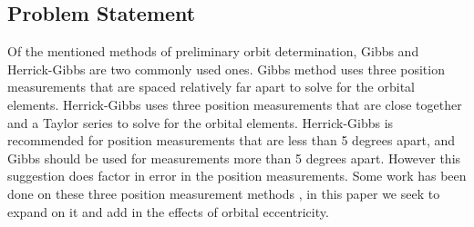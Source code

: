 \documentclass[12pt]{article}
\begin{document}
		\subsection{Problem Statement}
		Of the mentioned methods of preliminary orbit determination, Gibbs and Herrick-Gibbs are two commonly used ones. Gibbs method uses three position measurements that are spaced relatively far apart to solve for the orbital elements. Herrick-Gibbs uses three position measurements that are close together and a Taylor series to solve for the orbital elements. Herrick-Gibbs is recommended for position measurements that are less than 5 degrees apart, and Gibbs should be used for measurements more than 5 degrees apart\cite{vallado2007fundamentals}. However this suggestion does factor in error in the position measurements. Some work has been done on these three position measurement methods \cite{Kaushick}, in this paper we seek to expand on it and add in the effects of orbital eccentricity.
		
		
		
		

	\newpage
\end{document}
